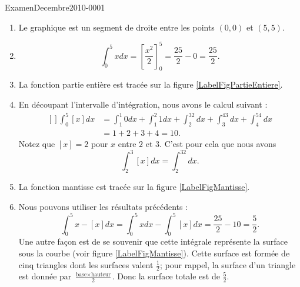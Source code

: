 
\begin{corrige}{ExamenDecembre2010-0001}

	\begin{enumerate}
		\item
			Le graphique est un segment de droite entre les points $(0,0)$ et $(5,5)$.
		\item
			\begin{equation}
				\int_0^5xdx=\left[ \frac{ x^2 }{2} \right]^5_0=\frac{ 25 }{2}-0=\frac{ 25 }{2}.
			\end{equation}
		\item
			La fonction partie entière est tracée sur la figure \ref{LabelFigPartieEntiere}.
			\newcommand{\CaptionFigPartieEntiere}{La fonction partie entière.}
			
		\item
			En découpant l'intervalle d'intégration, nous avons le calcul suivant :
			\begin{equation}
				\begin{aligned}[]
					\int_0^5[x]dx&=\int_1^1 0dx+\int_1^2 1dx+\int_2^32dx+\int_3^43dx+\int_4^54dx\\
					&=1+2+3+4=10.
				\end{aligned}
			\end{equation}
			Notez que $[x]=2$ pour $x$ entre $2$ et $3$. C'est pour cela que nous avons
			\begin{equation}
				\int_2^3[x]dx=\int_2^32dx.
			\end{equation}
			
		\item
			La fonction mantisse est tracée sur la figure \ref{LabelFigMantisse}.
			\newcommand{\CaptionFigMantisse}{La fonction mantisse. Remarquez que du point de vue de la surface, ce sont des petits triangles.}
			
		\item
			Nous pouvons utiliser les résultats précédents :
			\begin{equation}
				\int_0^5x-[x]dx=\int_0^5xdx-\int_0^5[x]dx=\frac{ 25 }{ 2 }-10=\frac{ 5 }{2}.
			\end{equation}
			Une autre façon est de se souvenir que cette intégrale représente la surface sous la courbe (voir figure \ref{LabelFigMantisse}). Cette surface est formée de cinq triangles dont les surfaces valent $\frac{ 1 }{2}$; pour rappel, la surface d'un triangle est donnée par $\frac{ \text{base}\times\text{hauteur} }{2}$. Donc la surface totale est de $\frac{ 5 }{2}$.

	\end{enumerate}

\end{corrige}
